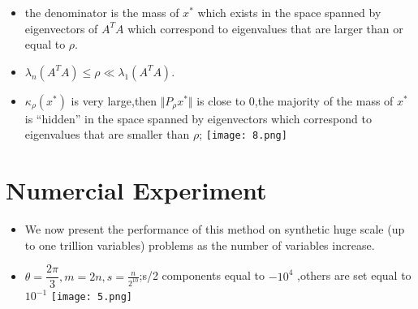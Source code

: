 \documentclass{beamer}
\begin{document}
\begin{frame}
	\begin{itemize} 
		\item the denominator is the mass of $x^*$ which exists in the space spanned by eigenvectors of $A^TA$ which correspond to eigenvalues that are larger than or equal to $\rho$.
		\item $\lambda_{n}(A^T A)\leq \rho \ll\lambda_{1}(A^T A)$.
		\item $\kappa_{\rho}\left(x{^*}\right)$ is very large,then $\Vert P_{\rho}x^*\Vert$ is close to 0,the majority of the mass of $x^*$ is “hidden” in the space spanned by eigenvectors which correspond to eigenvalues that are smaller than $\rho$;
		\texttt{[image: 8.png]}
	\end{itemize}
\end{frame}

\section{Numercial Experiment}
\begin{frame}
    \tableofcontents[currentsection]
\end{frame}

\begin{frame}
	\begin{itemize}
			\item We now present the performance of this method on synthetic huge scale (up to one trillion variables) problems as the number of variables increase.
			\item $\theta=\dfrac{2\pi}{3},m=2n,s =\frac{n}{2^{10}}$;s/2 components equal to $-10^4$ ,others are set equal to $10^{-1}$
			\texttt{[image: 5.png]}
	\end{itemize}
\end{frame}
\end{document}
